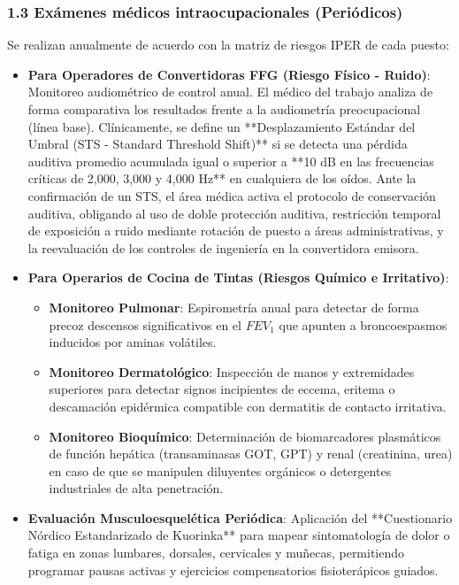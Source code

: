 \documentclass[11pt, letterpaper]{article}
\begin{document}
\subsubsection{1.3 Exámenes médicos intraocupacionales (Periódicos)}
Se realizan anualmente de acuerdo con la matriz de riesgos IPER de cada puesto:
\begin{itemize}
    \item \textbf{Para Operadores de Convertidoras FFG (Riesgo Físico - Ruido)}:
    Monitoreo audiométrico de control anual. El médico del trabajo analiza de forma comparativa los resultados frente a la audiometría preocupacional (línea base). Clínicamente, se define un **Desplazamiento Estándar del Umbral (STS - Standard Threshold Shift)** si se detecta una pérdida auditiva promedio acumulada igual o superior a **10 dB en las frecuencias críticas de 2,000, 3,000 y 4,000 Hz** en cualquiera de los oídos. Ante la confirmación de un STS, el área médica activa el protocolo de conservación auditiva, obligando al uso de doble protección auditiva, restricción temporal de exposición a ruido mediante rotación de puesto a áreas administrativas, y la reevaluación de los controles de ingeniería en la convertidora emisora.
    \item \textbf{Para Operarios de Cocina de Tintas (Riesgos Químico e Irritativo)}:
    \begin{itemize}
        \item \textbf{Monitoreo Pulmonar}: Espirometría anual para detectar de forma precoz descensos significativos en el $FEV_1$ que apunten a broncoespasmos inducidos por aminas volátiles.
        \item \textbf{Monitoreo Dermatológico}: Inspección de manos y extremidades superiores para detectar signos incipientes de eccema, eritema o descamación epidérmica compatible con dermatitis de contacto irritativa.
        \item \textbf{Monitoreo Bioquímico}: Determinación de biomarcadores plasmáticos de función hepática (transaminasas GOT, GPT) y renal (creatinina, urea) en caso de que se manipulen diluyentes orgánicos o detergentes industriales de alta penetración.
    \end{itemize}
    \item \textbf{Evaluación Musculoesquelética Periódica}:
    Aplicación del **Cuestionario Nórdico Estandarizado de Kuorinka** para mapear sintomatología de dolor o fatiga en zonas lumbares, dorsales, cervicales y muñecas, permitiendo programar pausas activas y ejercicios compensatorios fisioterápicos guiados.
\end{itemize}
\end{document}
